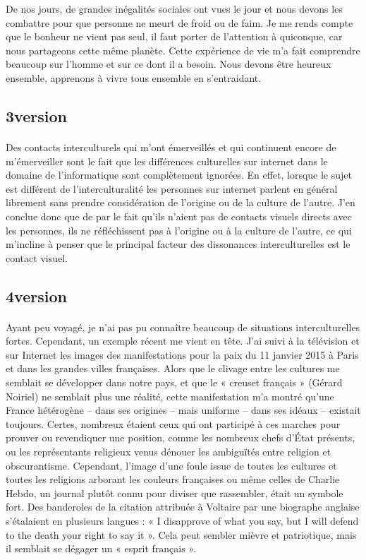 De nos jours, de grandes inégalités sociales ont vues le jour et nous devons
les combattre pour que personne ne meurt de froid ou de faim. Je me rends
compte que le bonheur ne vient pas seul, il faut porter de l'attention à
quiconque, car nous partageons cette même planète.  Cette expérience de vie m'a
fait comprendre beaucoup sur l'homme et sur ce dont il a besoin. Nous devons
être heureux ensemble, apprenons à vivre tous ensemble en s'entraidant.

\subsection{3\ieme version}
\paragraph{}
Des contacts interculturels qui m'ont émerveillés et qui continuent encore de
m'émerveiller sont le fait que les différences culturelles sur internet dans le
domaine de l'informatique sont complètement ignorées. En effet, lorsque le
sujet est différent de l'interculturalité les personnes sur internet parlent en
général librement sans prendre considération de l'origine ou de la culture de
l'autre. J'en conclue donc que de par le fait qu'ils n'aient pas de contacts
visuels directs avec les personnes, ils ne réfléchissent pas à l'origine ou à la
culture de l'autre, ce qui m'incline à penser que le principal facteur des
dissonances interculturelles est le contact visuel.

\subsection{4\ieme version}
\paragraph{}
Ayant peu voyagé, je n'ai pas pu connaître beaucoup de situations
interculturelles fortes. Cependant, un exemple récent me vient en tête. J'ai
suivi à la télévision et sur Internet les images des manifestations pour la
paix du 11 janvier 2015 à Paris et dans les grandes villes françaises. Alors
que le clivage entre les cultures me semblait se développer dans notre pays, et
que le « creuset français » (Gérard Noiriel) ne semblait plus une réalité,
cette manifestation m'a montré qu'une France hétérogène – dans ses origines –
mais uniforme – dans ses idéaux – existait toujours. Certes, nombreux étaient
ceux qui ont participé à ces marches pour prouver ou revendiquer une position,
comme les nombreux chefs d'État présents, ou les représentants religieux venus
dénouer les ambiguïtés entre religion et obscurantisme. Cependant, l'image
d'une foule issue de toutes les cultures et toutes les religions arborant les
couleurs françaises ou même celles de Charlie Hebdo, un journal plutôt connu
pour diviser que rassembler, était un symbole fort. Des banderoles de la
citation attribuée à Voltaire par une biographe anglaise s’étalaient en
plusieurs langues : « I disapprove of what you say, but I will defend to the
death your right to say it ». Cela peut sembler mièvre et patriotique, mais il
semblait se dégager un « esprit français ».

